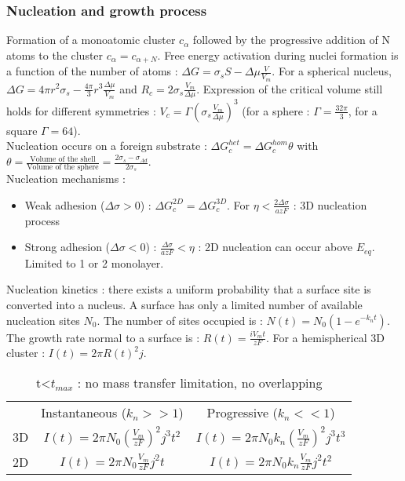 \documentclass[../main.tex]{subfiles}
\begin{document}
\subsubsection{Nucleation and growth process}

Formation of a monoatomic cluster $c_\alpha$ followed by the progressive addition of N atoms to the cluster $c_\alpha = c_{\alpha+N}$. Free energy activation during nuclei formation is a function of the number of atoms : $\Delta G = \sigma_s S - \Delta \mu \frac{V}{V_m}$. For a spherical nucleus, $\Delta G = 4\pi r^2 \sigma_s - \frac{4\pi}{3} r^3 \frac{\Delta \mu}{V_m}$ and $R_c = 2\sigma_s \frac{V_m}{\Delta \mu}$. Expression of the critical volume still holds for different symmetries : $V_c = \Gamma (\sigma_s \frac{V_m}{\Delta \mu})^3$ (for a sphere : $\Gamma = \frac{32\pi}{3}$, for a square $\Gamma = 64$).\\

Nucleation occurs on a foreign substrate : $\Delta G_c^{het} = \Delta G_c^{hom} \theta$ with $\theta = \frac{\text{Volume of the shell}}{\text{Volume of the sphere}} = \frac{2 \sigma_s - \sigma_{Ad}}{2\sigma_s}$.\\

Nucleation mechanisms : \begin{itemize}
    \item Weak adhesion ($\Delta \sigma >0$) : $\Delta G_c^{2D} = \Delta G_c^{3D}$. For $\eta < \frac{2\Delta \sigma}{azF}$ : 3D nucleation process
    \item Strong adhesion ($\Delta \sigma<0$) : $\frac{\Delta \sigma}{azF}< \eta$ : 2D nucleation can occur above $E_{eq}$. Limited to 1 or 2 monolayer.
\end{itemize}

Nucleation kinetics : there exists a uniform probability that a surface site is converted into a nucleus. A surface has only a limited number of available nucleation sites $N_0$. The number of sites occupied is : $N(t) = N_0(1-e^{-k_nt})$.\\
The growth rate normal to a surface is : $R(t) = \frac{iV_m t}{zF}$. For a hemispherical 3D cluster : $I(t) = 2\pi R(t)^2 j$.\\

\begin{table}[hbt!]
    \centering
    \begin{tabular}{c|c|c}
         & Instantaneous ($k_n>>1$)& Progressive ($k_n<<1$)\\
        3D & $I(t) = 2\pi N_0 (\frac{V_m}{zF})^2 j^3 t^2$ & $I(t) = 2\pi N_0 k_n(\frac{V_m}{zF})^2 j^3 t^3$ \\
        2D & $I(t) = 2\pi N_0 \frac{V_m}{zF} j^2 t$ & $I(t) = 2\pi N_0 k_n \frac{V_m}{zF} j^2 t^2$
    \end{tabular}
    \caption{t<$t_{max}$ : no mass transfer limitation, no overlapping}
\end{table}
\end{document}
